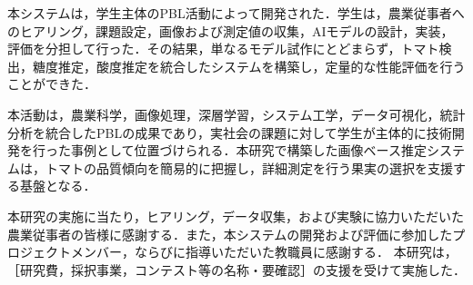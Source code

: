 \documentclass[authorproof,JRM,paper]{fujipressarticle}
\begin{document}
本システムは，学生主体のPBL活動によって開発された．学生は，農業従事者へのヒアリング，課題設定，画像および測定値の収集，AIモデルの設計，実装，評価を分担して行った．その結果，単なるモデル試作にとどまらず，トマト検出，糖度推定，酸度推定を統合したシステムを構築し，定量的な性能評価を行うことができた．

本活動は，農業科学，画像処理，深層学習，システム工学，データ可視化，統計分析を統合したPBLの成果であり，実社会の課題に対して学生が主体的に技術開発を行った事例として位置づけられる．本研究で構築した画像ベース推定システムは，トマトの品質傾向を簡易的に把握し，詳細測定を行う果実の選択を支援する基盤となる．

\acknowledgments
本研究の実施に当たり，ヒアリング，データ収集，および実験に協力いただいた農業従事者の皆様に感謝する．また，本システムの開発および評価に参加したプロジェクトメンバー，ならびに指導いただいた教職員に感謝する．
本研究は，［研究費，採択事業，コンテスト等の名称・要確認］の支援を受けて実施した．




\begin{profile}
\end{profile}
\end{document}
